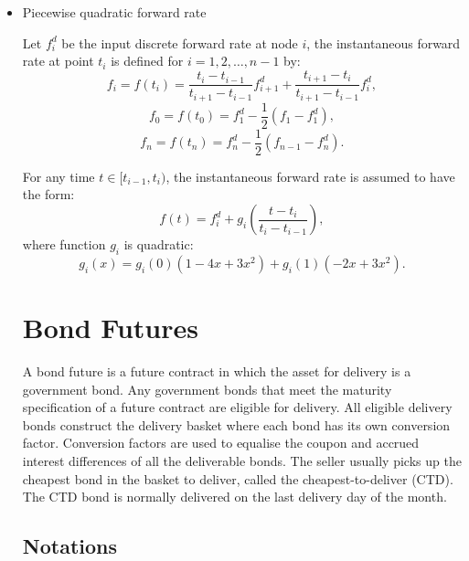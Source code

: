 \begin{itemize}
  \item Piecewise quadratic forward rate

  Let $f_i^d$ be the input discrete forward rate at node $i$, the instantaneous
  forward rate at point $t_i$ is defined for $i=1,2,\dots,n-1$ by:
  \begin{equation}
    f_i = f(t_i) = \frac{t_i-t_{i-1}}{t_{i+1}-t_{i-1}} f^d_{i+1}
                   + \frac{t_{i+1}-t_{i}}{t_{i+1}-t_{i-1}} f^d_{i},
  \end{equation}
  \begin{equation}
    f_0 = f(t_0) = f_1^d - \frac{1}{2}(f_1 - f_1^d),
  \end{equation}
  \begin{equation}
    f_n = f(t_n) = f_n^d - \frac{1}{2}(f_{n-1} - f_n^d).
  \end{equation}

  For any time $t\in [t_{i-1},t_i)$, the instantaneous forward rate is assumed
  to have the form:
  \begin{equation}
    f(t) = f_i^d + g_i\left( \frac{t-t_i}{t_i-t_{i-1}} \right),
  \end{equation}
  where function $g_i$ is quadratic:
  \[
	  g_i(x) = g_i(0)(1- 4x + 3x^2) + g_i(1)(-2x+3x^2).
  \]


\section{Bond Futures}

A bond future is a future contract in which the asset for delivery is a
government bond.
Any government bonds that meet the maturity specification of a
future contract are eligible for delivery.
All eligible delivery bonds construct the delivery basket where each
bond has its own conversion factor.
Conversion factors are used to equalise the coupon and accrued
interest differences of all the deliverable bonds.
The seller usually picks up the cheapest bond in the basket to
deliver, called the cheapest-to-deliver (CTD).
The CTD bond is normally delivered on the last delivery day of the
month.

\subsection{Notations}


\end{itemize}
